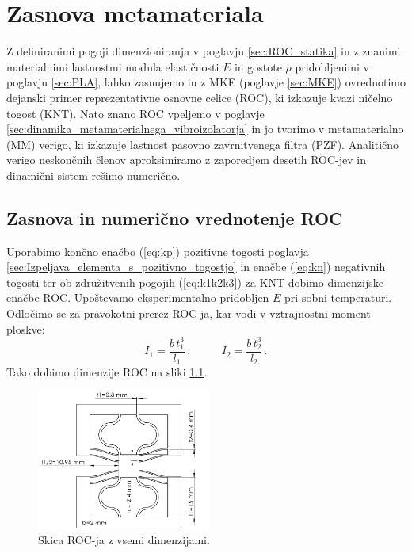 
\chapter{Zasnova metamateriala}\label{sec:Zasnova_metamateriala}

    Z definiranimi pogoji dimenzioniranja v poglavju \ref{sec:ROC_statika} in z znanimi materialnimi lastnostmi modula elastičnosti $E$ in gostote $\rho$ pridobljenimi v poglavju \ref{sec:PLA}, lahko zasnujemo in z MKE (poglavje \ref{sec:MKE}) ovrednotimo dejanski primer reprezentativne osnovne celice (ROC), ki izkazuje kvazi ničelno togost (KNT). Nato znano ROC vpeljemo v poglavje \ref{sec:dinamika_metamaterialnega_vibroizolatorja} in jo tvorimo v metamaterialno (MM) verigo, ki izkazuje lastnost pasovno zavrnitvenega filtra (PZF). Analitično verigo neskončnih členov aproksimiramo z zaporedjem desetih ROC-jev in dinamični sistem rešimo numerično. 

    \section{Zasnova in numerično vrednotenje ROC}

        Uporabimo končno enačbo (\ref{eq:kp}) pozitivne togosti poglavja \ref{sec:Izpeljava_elementa_s_pozitivno_togostjo} in enačbe (\ref{eq:kn}) negativnih togosti ter ob združitvenih pogojih (\ref{eq:k1k2k3}) za KNT dobimo dimenzijske enačbe ROC. Upoštevamo eksperimentalno pridobljen $E$ pri sobni temperaturi. Odločimo se za pravokotni prerez ROC-ja, kar vodi v vztrajnostni moment ploskve: 
        \begin{equation}
            I_1=\frac{b\, t_1^3}{l_1} \, , \,\,\,\,\,\,\,\,\,\,\,\,\,\,\,\, I_2=\frac{b\, t_2^3}{l_2} \,.
        \end{equation}
        Tako dobimo dimenzije ROC na sliki \ref{fig:ROC_dimenzija}.
        \begin{figure}[!hb]
            \centering
            \includegraphics[width=0.51\textwidth]{Magisterski praktikum/slike/metodologija/ROC_dimenzije.png}
            \caption{Skica ROC-ja z vsemi dimenzijami.}\label{fig:ROC_dimenzija}
        \end{figure}
        
